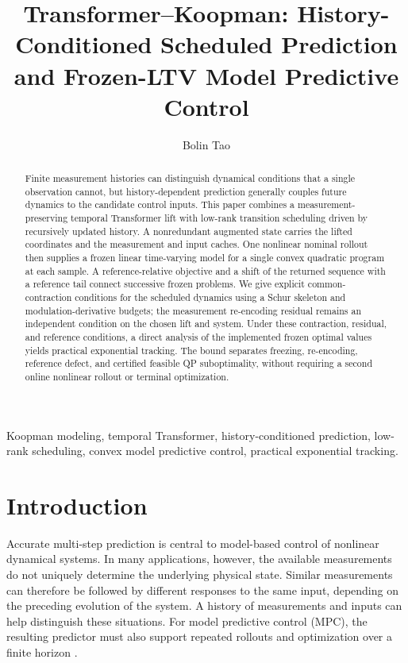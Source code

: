 \documentclass[journal]{IEEEtran}
\begin{document}
\title{Transformer--Koopman: History-Conditioned Scheduled Prediction and Frozen-LTV Model Predictive Control}
\author{Bolin Tao}
\maketitle

\begin{abstract}
Finite measurement histories can distinguish dynamical conditions that a single observation cannot, but history-dependent prediction generally couples future dynamics to the candidate control inputs. This paper combines a measurement-preserving temporal Transformer lift with low-rank transition scheduling driven by recursively updated history. A nonredundant augmented state carries the lifted coordinates and the measurement and input caches. One nonlinear nominal rollout then supplies a frozen linear time-varying model for a single convex quadratic program at each sample. A reference-relative objective and a shift of the returned sequence with a reference tail connect successive frozen problems. We give explicit common-contraction conditions for the scheduled dynamics using a Schur skeleton and modulation-derivative budgets; the measurement re-encoding residual remains an independent condition on the chosen lift and system. Under these contraction, residual, and reference conditions, a direct analysis of the implemented frozen optimal values yields practical exponential tracking. The bound separates freezing, re-encoding, reference defect, and certified feasible QP suboptimality, without requiring a second online nonlinear rollout or terminal optimization.
\end{abstract}
\begin{IEEEkeywords}
Koopman modeling, temporal Transformer, history-conditioned prediction, low-rank scheduling, convex model predictive control, practical exponential tracking.
\end{IEEEkeywords}

\section{Introduction}
\label{sec:introduction}
Accurate multi-step prediction is central to model-based control of nonlinear dynamical systems. In many applications, however, the available measurements do not uniquely determine the underlying physical state. Similar measurements can therefore be followed by different responses to the same input, depending on the preceding evolution of the system. A history of measurements and inputs can help distinguish these situations. For model predictive control (MPC), the resulting predictor must also support repeated rollouts and optimization over a finite horizon \cite{ljung1999system,nelles2020nonlinear,forgione2021dynonet}.
\end{document}
